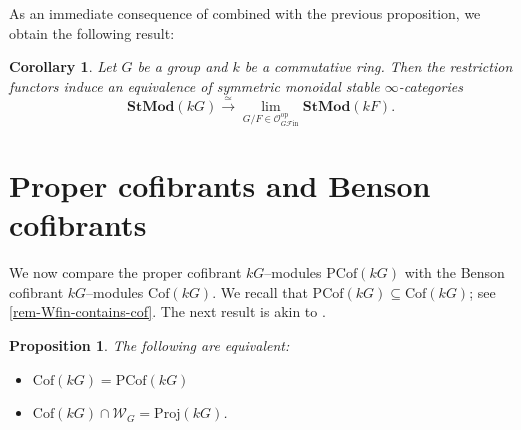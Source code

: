 \documentclass{amsart}
\newcommand{\GD}[1]{{\color{ForestGreen} G: [#1]}}
\newcommand{\nameop}{\operatorname{op}\nolimits}
\def \Wfin{{\mathcal W}_{G}}
\def \Ofin{{\mathcal O}_{G{\mathcal{F}\textrm{in}}}}
\numberwithin{equation}{section}%
\newtheorem{proposition}[equation]{Proposition}
\newtheorem{corollary}[equation]{Corollary}
\theoremstyle{remark}
\begin{document}
{As an immediate consequence of \cite[Theorem 7.4]{GP26} combined with the previous proposition, we obtain the following result:  

\begin{corollary}\label{coro-stmod-descent}
    Let $G$ be a group and $k$ be a commutative ring. Then the restriction functors induce an equivalence of symmetric monoidal stable $\infty$-categories 
    \[
    \mathbf{StMod}(kG)\xrightarrow[]{\simeq} \lim_{G/F\in \Ofin^{\nameop}}\mathbf{StMod}(kF).
    \]
\end{corollary}



\section{Proper cofibrants and Benson cofibrants}
\label{subsec:comparison} 


We now compare the proper cofibrant $kG$--modules $\mathrm{PCof}(kG)$ with the Benson cofibrant $kG$--modules $\mathrm{Cof}(kG)$.
We recall that $\mathrm{PCof}(kG)\subseteq \mathrm{Cof}(kG)$; see \cref{rem-Wfin-contains-cof}. The next result is akin to \cite[Proposition~4.3]{ET_cof}.

\begin{proposition}
\label{prop:equality of classes}
The following are equivalent:
\begin{itemize}
\item[(i)] $\mathrm{Cof}(kG)=\mathrm{PCof}(kG)$
\item[(ii)] $\mathrm{Cof}(kG)\cap\Wfin = \mathrm{Proj}(kG)$.
\end{itemize}
\end{proposition}

}
\end{document}
